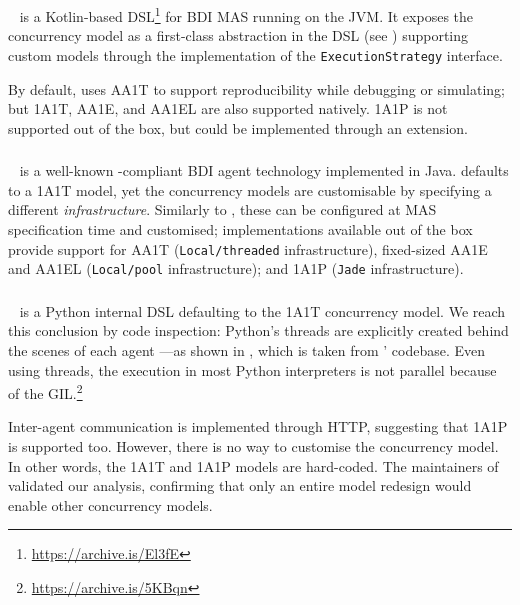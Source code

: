 \jakta{}~\cite{BaiardiBCP23} is a Kotlin-based \ac{DSL}\footnote{
    \url{https://archive.is/El3fE}
} for \ac{BDI} \ac{MAS} running on the \ac{JVM}.
%
It exposes the concurrency model as a first-class abstraction 
in the \ac{DSL} (see )
supporting custom models
through the implementation of the \texttt{ExecutionStrategy} interface.
%

%
By default, \jakta{} uses \ac{AA1T}
to support reproducibility while debugging or simulating;
but \ac{1A1T}, \ac{AA1E}, and \ac{AA1EL}
are also supported natively.
%
\ac{1A1P} is not supported out of the box,
but could be implemented through an extension.

\subsubsection{\jason{}}

\jason{}~\cite{BordiniHW2007} is a well-known
\agentspeak{}-compliant
\ac{BDI} agent technology implemented in Java.
%
\jason{} defaults to a \ac{1A1T} model,
yet the concurrency models are customisable
by specifying a different \emph{infrastructure}.
%
Similarly to \jakta{},
these can be configured at \ac{MAS} specification time and customised;
implementations available out of the box provide support for
\ac{AA1T} (\texttt{Local/threaded} infrastructure),
fixed-sized \ac{AA1E} and \ac{AA1EL} (\texttt{Local/pool} infrastructure);
and \ac{1A1P} (\texttt{Jade} infrastructure).

\subsubsection{\phidias{}}

\phidias{}~\cite{DUrsoLS19} is a Python internal \ac{DSL}
defaulting to the \ac{1A1T} concurrency model.
%
We reach this conclusion by code inspection: 
Python's threads are explicitly created behind the scenes of each agent%
---as shown in , 
which is taken from \phidias{}' codebase.
%
Even using threads,
the execution in most Python interpreters is not parallel
because of the \ac{GIL}.\footnote{\url{https://archive.is/5KBqn}}

Inter-agent communication is implemented through HTTP,
suggesting that \ac{1A1P} is supported too.
%
However, there is no way to customise the concurrency model.
%
In other words, the \ac{1A1T} and \ac{1A1P} models are hard-coded.
%
The maintainers of \phidias{} validated our analysis,
confirming that only an entire model redesign would enable other concurrency models.

